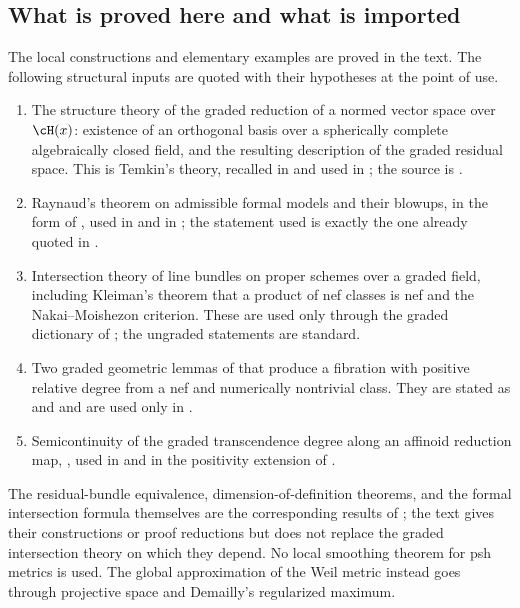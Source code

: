 \subsection{What is proved here and what is imported}
\label{sec:ch17-imported}

The local constructions and elementary examples are proved in the text.
The following structural inputs are quoted with their hypotheses at the
point of use.

\begin{enumerate}
\item The structure theory of the graded reduction of a normed vector
 space over $\cH(x)$: existence of an orthogonal basis over a spherically
 complete algebraically closed field, and the resulting description of the
 graded residual space.  This is Temkin's theory, recalled in
  and used in
 ; the source is \cite{Tem16,Temkin2004}.
\item Raynaud's theorem on admissible formal models and their blowups,
 in the form of \cite{BoschLutkebohmert1993}, used in
  and in ; the
 statement used is exactly the one already quoted in
 .
\item Intersection theory of line bundles on proper schemes over a graded
 field, including Kleiman's theorem that a product of nef classes is nef and
 the Nakai--Moishezon criterion.  These are used only through the graded
 dictionary of ; the ungraded statements are
 standard.
\item Two graded geometric lemmas of \cite[\S18.9]{CLD25} that produce a
 fibration with positive relative degree from a nef and numerically
 nontrivial class.  They are stated as  and
  and are used only in
 .
\item Semicontinuity of the graded transcendence degree along an affinoid
 reduction map, \cite[Proposition~11.10.4]{CLD25}, used in
  and in the positivity extension of
 .
\end{enumerate}

The residual-bundle equivalence, dimension-of-definition theorems, and the
formal intersection formula themselves are the corresponding results of
\cite[Chapters~17--18]{CLD25}; the text gives their constructions or proof
reductions but does not replace the graded intersection theory on which they
depend.  No local smoothing theorem for psh metrics is used.  The global
approximation of the Weil metric instead goes through projective space and
Demailly's regularized maximum.

